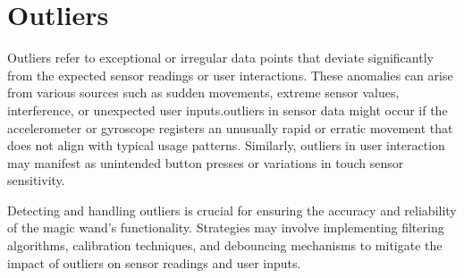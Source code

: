 \section{Outliers}
	Outliers refer to exceptional or irregular data points that deviate significantly from the expected sensor readings or user interactions. These anomalies can arise from various sources such as sudden movements, extreme sensor values, interference, or unexpected user inputs.outliers in sensor data might occur if the accelerometer or gyroscope registers an unusually rapid or erratic movement that does not align with typical usage patterns. Similarly, outliers in user interaction may manifest as unintended button presses or variations in touch sensor sensitivity.

	Detecting and handling outliers is crucial for ensuring the accuracy and reliability of the magic wand's functionality. Strategies may involve implementing filtering algorithms, calibration techniques, and debouncing mechanisms to mitigate the impact of outliers on sensor readings and user inputs.\cite{Munoz:2019}
